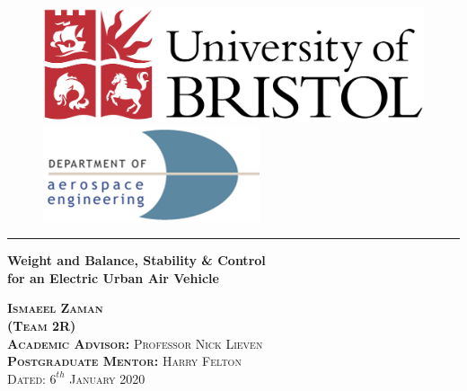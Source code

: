 \documentclass[11pt,a4paper]{article}
\begin{document}
\begin{titlepage}

\begin{figure}[H]
  \includegraphics[width=.75\linewidth]{University_of_Bristol_logo.png}
  \endminipage\hfill
  \centering
    \endminipage\hfill
    \hspace{12mm}
      \includegraphics[width=.75\linewidth]{Aero_logo.png}
      \endminipage
      \end{figure}

\center 
\vspace{20mm}
\hrule

{\Large  \textbf{Weight and Balance, Stability \& Control \\ \vspace{2mm}
for an Electric Urban Air Vehicle }}
\vspace{10mm}

\textsc{\textbf{Ismaeel Zaman}} \\
\textsc{\textbf{(Team 2R)}}\\
\vspace{10mm}
\textsc{\textbf{Academic Advisor:} Professor Nick Lieven} \\
\textsc{\textbf{Postgraduate Mentor:} Harry Felton}
\\[0.5cm]

\vspace{24pt}
\textsc{\large Dated: {$6^{th}$ January 2020}} 
\vspace{6pt}


\end{titlepage}
\end{document}

